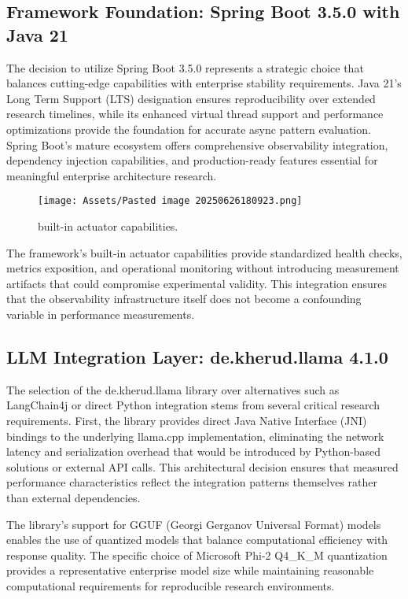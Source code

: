 \subsection{Framework Foundation: Spring Boot 3.5.0 with Java 21}

The decision to utilize Spring Boot 3.5.0 represents a strategic choice that balances cutting-edge capabilities with enterprise stability requirements. Java 21's Long Term Support (LTS) designation ensures reproducibility over extended research timelines, while its enhanced virtual thread support and performance optimizations provide the foundation for accurate async pattern evaluation. Spring Boot's mature ecosystem offers comprehensive observability integration, dependency injection capabilities, and production-ready features essential for meaningful enterprise architecture research.

\begin{figure}[H]
    \centering
    \texttt{[image: Assets/Pasted image 20250626180923.png]}
    \caption{built-in actuator capabilities. \cite{SpringBootActuator}}
\end{figure}
The framework's built-in actuator capabilities provide standardized health checks, metrics exposition, and operational monitoring without introducing measurement artifacts that could compromise experimental validity. This integration ensures that the observability infrastructure itself does not become a confounding variable in performance measurements.

\subsection{LLM Integration Layer: de.kherud.llama 4.1.0}

The selection of the de.kherud.llama library \cite{LlamaJavaBinding} over alternatives such as LangChain4j or direct Python integration stems from several critical research requirements. First, the library provides direct Java Native Interface (JNI) bindings to the underlying llama.cpp implementation, eliminating the network latency and serialization overhead that would be introduced by Python-based solutions or external API calls. This architectural decision ensures that measured performance characteristics reflect the integration patterns themselves rather than external dependencies.

The library's support for GGUF (Georgi Gerganov Universal Format) models enables the use of quantized models that balance computational efficiency with response quality. The specific choice of Microsoft Phi-2 Q4\_K\_M quantization provides a representative enterprise model size while maintaining reasonable computational requirements for reproducible research environments.

